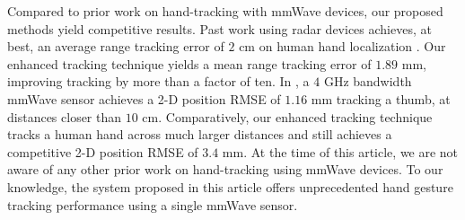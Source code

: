 \documentclass[10pt,journal,final]{IEEEtran}
\begin{document}
Compared to prior work on hand-tracking with mmWave devices, our proposed methods yield competitive results.
Past work using radar devices achieves, at best, an average range tracking error of $2$ cm on human hand localization \cite{mmWave_tracking:WiDeo}. 
Our enhanced tracking technique yields a mean range tracking error of $1.89$ mm, improving tracking by more than a factor of ten.
In \cite{mmWave_tracking:ThuMouse}, a $4$ GHz bandwidth mmWave sensor achieves a 2-D position RMSE of $1.16$ mm tracking a thumb, at distances closer than $10$ cm.
Comparatively, our enhanced tracking technique tracks a human hand across much larger distances and still achieves a competitive 2-D position RMSE of $3.4$ mm. 
At the time of this article, we are not aware of any other prior work on hand-tracking using mmWave devices. 
To our knowledge, the system proposed in this article offers unprecedented hand gesture tracking performance using a single mmWave sensor.

\end{document}
